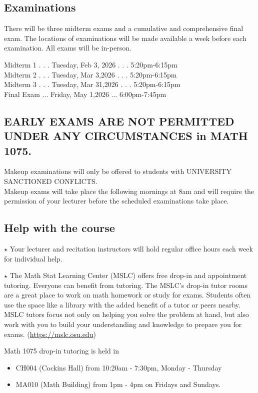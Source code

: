 \documentclass{ximera}
\begin{document}
\subsection*{Examinations}
There will be three midterm exams and a cumulative and comprehensive final exam. The locations of examinations will be made available a week before each examination. All exams will be in-person.

Midterm 1 . . . Tuesday, Feb 3, 2026 . . . 5:20pm-6:15pm\\
Midterm 2 . . . Tuesday, Mar 3,2026 . . . 5:20pm-6:15pm\\
Midterm 3 . . . Tuesday, Mar 31,2026 . . . 5:20pm-6:15pm\\
Final Exam ... Friday, May 1,2026 ... 6:00pm-7:45pm

\subsection*{EARLY EXAMS ARE NOT PERMITTED UNDER ANY CIRCUMSTANCES in MATH 1075.}
Makeup examinations will only be offered to students with UNIVERSITY SANCTIONED CONFLICTS.\\
Makeup exams will take place the following mornings at 8am and will require the permission of your lecturer before the scheduled examinations take place.

\subsection*{Help with the course}
$\star$ Your lecturer and recitation instructors will hold regular office hours each week for individual help.

$\star$ The Math Stat Learning Center (MSLC) offers free drop-in and appointment tutoring. Everyone can benefit from tutoring. The MSLC's drop-in tutor rooms are a great place to work on math homework or study for exams. Students often use the space like a library with the added benefit of a tutor or peers nearby. MSLC tutors focus not only on helping you solve the problem at hand, but also work with you to build your understanding and knowledge to prepare you for exams. (\href{https://mslc.osu.edu}{https://mslc.osu.edu})

Math 1075 drop-in tutoring is held in

\begin{itemize}
  \item CH004 (Cockins Hall) from 10:20am - 7:30pm, Monday - Thursday
  \item MA010 (Math Building) from 1pm - 4pm on Fridays and Sundays.
\end{itemize}
\end{document}
